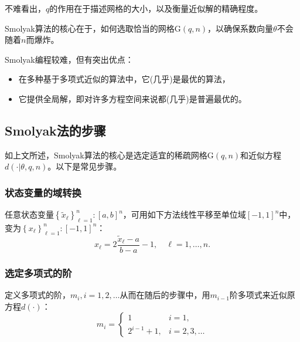 不难看出，$q$的作用在于描述网格的大小，以及衡量近似解的精确程度。

Smolyak算法的核心在于，如何选取恰当的网格$\mathrm{G}(q,n)$，以确保系数向量$\theta$不会随着$n$而爆炸。

Smolyak编程较难，但有突出优点：
\begin{itemize}
  \item 在多种基于多项式近似的算法中，它(几乎)是最优的算法\citep{Barthelmann:2000bq}，
  \item 它提供全局解，即对许多方程空间来说都(几乎)是普遍最优的。
\end{itemize}

\subsection{Smolyak法的步骤}
\label{sec:pj-sparsity-steps}
如上文所述，Smolyak算法的核心是选定适宜的稀疏网格$\mathrm{G}(q,n)$和近似方程$d \left( \cdot | \theta, q, n\right)$。以下是常见步骤。

\subsubsection{状态变量的域转换}
\label{sec:pj-sparsity-steps-interval}
任意状态变量$\left\{ \tilde{x}_{\ell} \right\}_{\ell = 1}^{n}: \left[ a, b \right]^{n}$，可用如下方法线性平移至单位域$[-1,1]^{n}$中，变为$\left\{ x_{\ell} \right\}_{\ell = 1}^{n}: \left[ -1, 1 \right]^{n}$：
\begin{equation}
  \label{eq:pj-sparsity-steps-interval}
  x_{\ell} = 2 \frac{\tilde{x}_{\ell} - a}{b-a} -1, \quad \ell = 1, \ldots, n.
\end{equation}

\subsubsection{选定多项式的阶}
\label{sec:pj-sparsity-steps-poly-order}
定义多项式的阶，$m_{i}, i=1,2,\ldots$从而在随后的步骤中，用$m_{i-1}$阶多项式来近似原方程$d(\cdot)$：
\begin{equation}
  \label{eq:pj-sparsity-steps-poly-order}
  m_{i} = \begin{cases}
  1 & i = 1, \\
  2^{i-1} +1, & i=2,3,\ldots
  \end{cases}
\end{equation}

